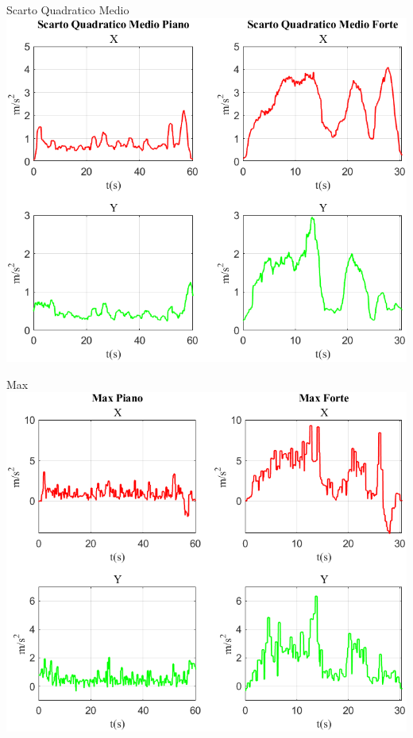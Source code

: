 \documentclass[beamer]{standalone}
\begin{document}
	\begin{frame}{{Scarto Quadratico Medio}}
		\centering\includegraphics[height=.8\textheight]{figure/Acc/Scarto Quadratico Medio}
	\end{frame}
	
	\begin{frame}{{Max}}
		\centering\includegraphics[height=.8\textheight]{figure/Acc/Max}
	\end{frame}
	
\end{document}
